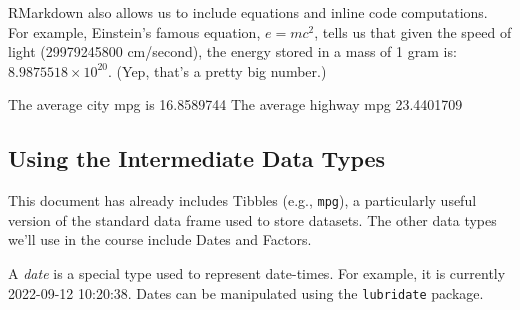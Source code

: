 \documentclass[
]{article}
\newenvironment{Shaded}{\begin{snugshade}}{\end{snugshade}}
\newcommand{\AttributeTok}[1]{\textcolor[rgb]{0.77,0.63,0.00}{#1}}
\newcommand{\FunctionTok}[1]{\textcolor[rgb]{0.00,0.00,0.00}{#1}}
\newcommand{\NormalTok}[1]{#1}
\newcommand{\SpecialCharTok}[1]{\textcolor[rgb]{0.00,0.00,0.00}{#1}}
\begin{document}
RMarkdown also allows us to include equations and inline code
computations. For example, Einstein's famous equation, \(e = mc^2\),
tells us that given the speed of light (29979245800 cm/second), the
energy stored in a mass of 1 gram is:
\ensuremath{8.9875518\times 10^{20}}. (Yep, that's a pretty big number.)

The average city mpg is 16.8589744 The average highway mpg 23.4401709

\hypertarget{using-the-intermediate-data-types}{%
\subsection{Using the Intermediate Data
Types}\label{using-the-intermediate-data-types}}

This document has already includes Tibbles (e.g., \texttt{mpg}), a
particularly useful version of the standard data frame used to store
datasets. The other data types we'll use in the course include Dates and
Factors.

A \emph{date} is a special type used to represent date-times. For
example, it is currently 2022-09-12 10:20:38. Dates can be manipulated
using the \texttt{lubridate} package.

\begin{Shaded}
\end{Shaded}
\end{document}
